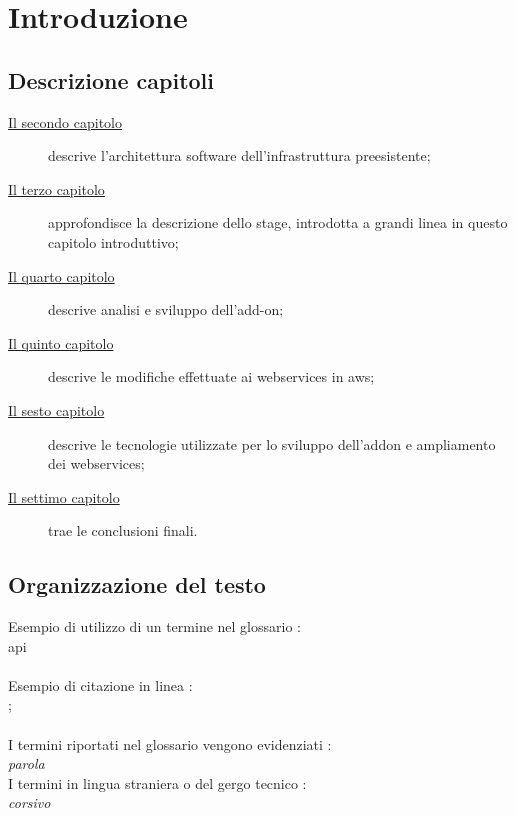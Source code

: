 
\chapter{Introduzione}
\label{cap:introduzione}

\section{Descrizione capitoli}
\begin{description}
	\item[{\hyperref[cap:descrizione-architettura]{Il secondo capitolo}}] descrive l'architettura software dell'infrastruttura preesistente;
	
	\item[{\hyperref[cap:descrizione-stage]{Il terzo capitolo}}] approfondisce la descrizione dello stage, introdotta a grandi linea in questo capitolo introduttivo;
	
	\item[{\hyperref[cap:sviluppo-addon]{Il quarto capitolo}}] descrive analisi e sviluppo dell'add-on;
	
	\item[{\hyperref[cap:webservices]{Il quinto capitolo}}] descrive le modifiche effettuate ai webservices in \gls{aws};
	
	\item[{\hyperref[cap:tecnologie-coinvolte]{Il sesto capitolo}}] descrive le tecnologie utilizzate per lo sviluppo dell'addon e ampliamento dei webservices;
	
	\item[{\hyperref[cap:conclusioni]{Il settimo capitolo}}] trae le conclusioni finali.
\end{description}
\section{Organizzazione del testo}

\noindent Esempio di utilizzo di un termine nel glossario :\\\gls{api}\\ \\
\noindent Esempio di citazione in linea :\\\cite{site:sap-b1-wikipedia};\\\\
\noindent I termini riportati nel glossario vengono evidenziati :\\\emph{parola}\glsfirstoccur\\ \noindent I termini in lingua straniera o del gergo tecnico :\\ \emph{corsivo}\\


